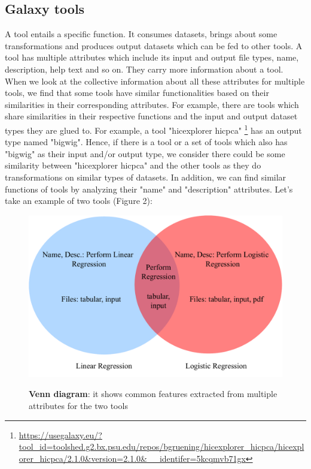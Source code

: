 \subsection{Galaxy tools}
A tool entails a specific function. It consumes datasets, brings about some transformations and produces output datasets which can be fed to other tools. A tool has multiple attributes which include its input and output file types, name, description, help text and so on. They carry more information about a tool. When we look at the collective information about all these attributes for multiple tools, we find that some tools have similar functionalities based on their similarities in their corresponding attributes. For example, there are tools which share similarities in their respective functions and the input and output dataset types they are glued to. For example, a tool "hicexplorer hicpca" \footnote{\url{https://usegalaxy.eu/?tool_id=toolshed.g2.bx.psu.edu/repos/bgruening/hicexplorer_hicpca/hicexplorer_hicpca/2.1.0&version=2.1.0&__identifer=5kcqmvb71gx}}  has an output type named "bigwig". Hence, if there is a tool or a set of tools which also has "bigwig" as their input and/or output type, we consider there could be some similarity between "hicexplorer hicpca" and the other tools as they do transformations on similar types of datasets. In addition, we can find similar functions of tools by analyzing their "name" and "description" attributes. Let's take an example of two tools (Figure 2):
 
\begin{figure}[h]
\begin{centering}
    {\includegraphics[scale=0.5]{figures/Venn_common_tools_info.pdf}}
    \caption[Venn diagram]{\textbf{Venn diagram}: it shows common features extracted from multiple attributes for the two tools}
\end{centering}
\end{figure}

